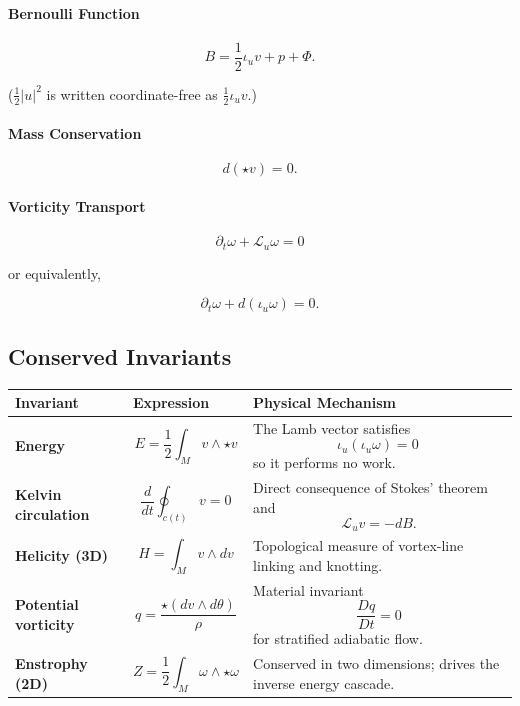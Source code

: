 \documentclass[11pt]{article}
\begin{document}
\paragraph{Bernoulli Function}

\[
B
=
\frac12\iota_u v
+
p
+
\Phi .
\]

\noindent
($\tfrac12|u|^2$ is written coordinate-free as
$\tfrac12\iota_u v$.)

\paragraph{Mass Conservation}

\[
d(\star v)=0.
\]

\paragraph{Vorticity Transport}

\[
\partial_t\omega+\mathcal L_u\omega=0
\]

or equivalently,

\[
\partial_t\omega+d(\iota_u\omega)=0.
\]

\subsection*{Conserved Invariants}

\begin{longtable}{>{\bfseries}p{}p{}p{}}
Invariant & Expression & Physical Mechanism\\
\midrule

Energy
&
\[
E=\frac12\int_M v\wedge\star v
\]
&
The Lamb vector satisfies
\[
\iota_u(\iota_u\omega)=0\,
\]
so it performs no work.\\

Kelvin circulation
&
\[
\frac{d}{dt}\oint_{c(t)}v=0
\]
&
Direct consequence of Stokes' theorem and
\[
\mathcal L_u v=-dB.
\]
\\

Helicity (3D)
&
\[
H=\int_M v\wedge dv
\]
&
Topological measure of vortex-line linking and knotting.\\

Potential vorticity
&
\[
q=\frac{\star(dv\wedge d\theta)}{\rho}
\]
&
Material invariant
\[
\frac{Dq}{Dt}=0
\]
for stratified adiabatic flow.\\

Enstrophy (2D)
&
\[
Z=\frac12\int_M\omega\wedge\star\omega
\]
&
Conserved in two dimensions; drives the inverse energy cascade.
\end{longtable}
\end{document}
